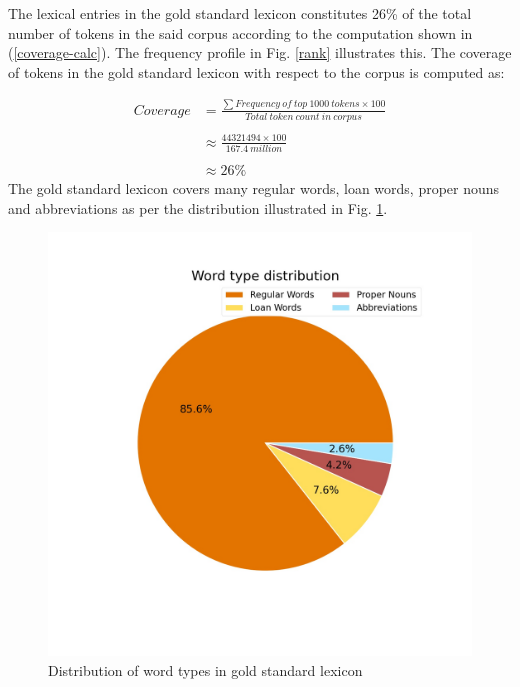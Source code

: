 \documentclass{ieeeaccess}
\begin{document}
The lexical entries in the gold standard lexicon constitutes  26\% of the total number of tokens in the said corpus according to the computation shown in (\ref{coverage-calc}). The frequency profile in Fig. \ref{rank} illustrates this. The coverage of tokens in the gold standard lexicon with respect to the corpus is computed as: 

\begin{equation}
\label{coverage-calc}
\begin{split}
Coverage & =\frac{\sum{}{}{Frequency\ of\ top\ 1000\ tokens} \times 100 }{Total\ token\ count\ in\ corpus}  \\ \\
&  \approx \frac{44321494 \times 100}{167.4\ million} \\ \\
& \approx 26 \%
\end{split}
\end{equation}
 The gold standard lexicon covers many regular words, loan words, proper nouns and abbreviations as per the distribution illustrated in Fig. \ref{pie-chart}. 



\begin{figure}[h]
    \centering
    \includegraphics[trim={8cm 8cm 0 3cm},clip=true, width=\linewidth]{wordtypes.jpg}
    \caption{Distribution of word types in gold standard lexicon}
    \label{pie-chart}
\end{figure}
\end{document}
